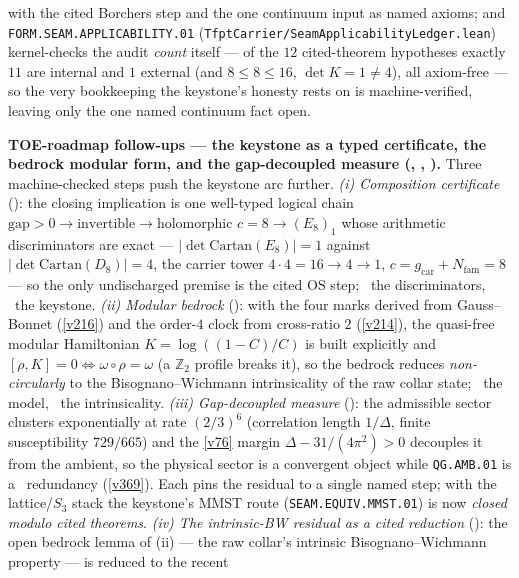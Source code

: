 \documentclass[11pt,a4paper]{article}
\newcommand{\Nfam}{N_{\mathrm{fam}}}
\newcommand{\gcar}{g_{\mathrm{car}}}
\newcommand{\Z}{\mathbb Z}
\begin{document}
\begin{keybox}
with the cited Borchers step and the one continuum input as named axioms; and
\texttt{FORM.SEAM.APPLICABILITY.01} (\texttt{TfptCarrier/SeamApplicabilityLedger.lean}) kernel-checks the audit
\emph{count} itself --- of the $12$ cited-theorem hypotheses exactly $11$ are internal and $1$ external (and
$8\le8\le16$, $\det K{=}1\neq4$), all axiom-free --- so the very bookkeeping the keystone's honesty rests on is
machine-verified, leaving only the one named continuum fact open.
\par\smallskip\noindent\textbf{TOE-roadmap follow-ups --- the keystone as a typed certificate, the bedrock
modular form, and the gap-decoupled measure (, ,
).} Three machine-checked steps push the keystone arc further.
\emph{(i) Composition certificate} (): the closing implication is one well-typed
logical chain $\text{gap}{>}0\to\text{invertible}\to\text{holomorphic }c{=}8\to(E_8)_1$ whose arithmetic
discriminators are exact --- $|\det\mathrm{Cartan}(E_8)|{=}1$ against $|\det\mathrm{Cartan}(D_8)|{=}4$, the carrier
tower $4{\cdot}4{=}16\to4\to1$, $c{=}\gcar{+}\Nfam{=}8$ --- so the only undischarged premise is the cited OS step;
\mE\ the discriminators, \mO\ the keystone. \emph{(ii) Modular bedrock} (): with the
four marks derived from Gauss--Bonnet (\vref{v216}) and the order-$4$ clock from cross-ratio $2$ (\vref{v214}), the
quasi-free modular Hamiltonian $K=\log((1{-}C)/C)$ is built explicitly and $[\rho,K]{=}0\Leftrightarrow
\omega{\circ}\rho{=}\omega$ (a $\Z_2$ profile breaks it), so the bedrock reduces \emph{non-circularly} to the
Bisognano--Wichmann intrinsicality of the raw collar state; \mE\ the model, \mO\ the intrinsicality.
\emph{(iii) Gap-decoupled measure} (): the admissible sector clusters
exponentially at rate $(2/3)^6$ (correlation length $1/\Delta$, finite susceptibility $729/665$) and the \vref{v76}
margin $\Delta-31/(4\pi^2)>0$ decouples it from the ambient, so the physical sector is a convergent object
while \texttt{QG.AMB.01} is a \mC\ redundancy (\vref{v369}). Each pins the residual to a single named step; with the
lattice/$S_3$ stack the keystone's MMST route (\texttt{SEAM.EQUIV.MMST.01}) is now \emph{closed modulo cited
theorems}.
\emph{(iv) The intrinsic-BW residual as a cited reduction} (): the open
bedrock lemma of (ii) --- the raw collar's intrinsic Bisognano--Wichmann property --- is reduced to the recent

\end{keybox}
\end{document}
